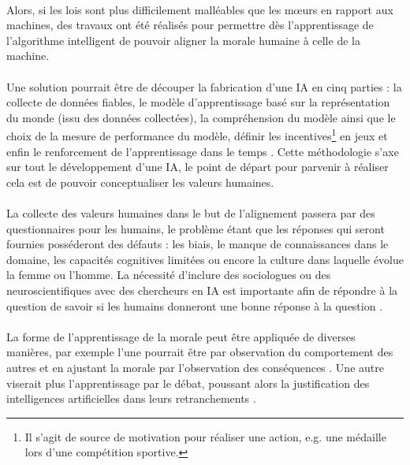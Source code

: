 \documentclass[10pt, french, a4paper]{report}
\begin{document}
\paragraph{}
Alors, si les lois sont plus difficilement malléables que les mœurs en rapport aux machines, des travaux ont été réalisés pour permettre dès l’apprentissage de l’algorithme intelligent de pouvoir aligner la morale humaine à celle de la machine.

\paragraph{}
Une solution pourrait être de découper la fabrication d’une IA en cinq parties : la collecte de données fiables, le modèle d’apprentissage basé sur la représentation du monde (issu des données collectées), la compréhension du modèle ainsi que le choix de la mesure de performance du modèle, définir les incentives\footnote{Il s’agit de source de motivation pour réaliser une action, e.g. une médaille lors d’une compétition sportive.} en jeux et enfin le renforcement de l’apprentissage dans le temps \citep{hoang_roadmap_2018}. Cette méthodologie s’axe sur tout le développement d’une IA, le point de départ pour parvenir à réaliser cela est de pouvoir conceptualiser les valeurs humaines.

\paragraph{}
La collecte des valeurs humaines dans le but de l’alignement passera par des questionnaires pour les humains, le problème étant que les réponses qui seront fournies posséderont des défauts : les biais, le manque de connaissances dans le domaine, les capacités cognitives limitées ou encore la culture dans laquelle évolue la femme ou l’homme. La nécessité d’inclure des sociologues ou des neuroscientifiques avec des chercheurs en IA est importante afin de répondre à la question de savoir si les humains donneront une bonne réponse à la question \citep{irving_ai_2019}.

\paragraph{}
La forme de l’apprentissage de la morale peut être appliquée de diverses manières, par exemple l’une pourrait être par observation du comportement des autres et en ajustant la morale par l’observation des conséquences \citep{cointe_ethical_2017}. Une autre viserait plus l’apprentissage par le débat, poussant alors la justification des intelligences artificielles dans leurs retranchements \citep{irving_ai_2019}.
\end{document}
